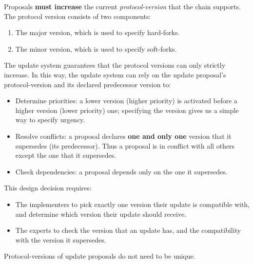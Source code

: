 Proposals \textbf{must increase} the current \emph{protocol-version} that the
chain supports. The protocol version consists of two components:
\begin{enumerate}
\item The major version, which is used to specify hard-forks.
\item The minor version, which is used to specify soft-forks.
\end{enumerate}

The update system guarantees that the protocol versions can only strictly
increase. In this way, the update system can rely on the update proposal's
protocol-version and its declared predecessor version to:
\begin{itemize}
\item Determine priorities: a lower version (higher priority) is activated 
before a higher version (lower priority) one; specifying the version gives us a 
simple way to specify urgency.
\item Resolve conflicts: a proposal declares \textbf{one and only one} version
  that it supersedes (its predecessor). Thus a proposal is in conflict with all
  others except the one that it supersedes.
\item Check dependencies: a proposal depends only on the one it supersedes.
\end{itemize}
This design decision requires:
\begin{itemize}
\item The implementers to pick exactly one version their update is compatible
  with, and determine which version their update should receive.
\item The experts to check the version that an update has, and the compatibility
  with the version it supersedes.
\end{itemize}

Protocol-versions of update proposals do not need to be unique. 

